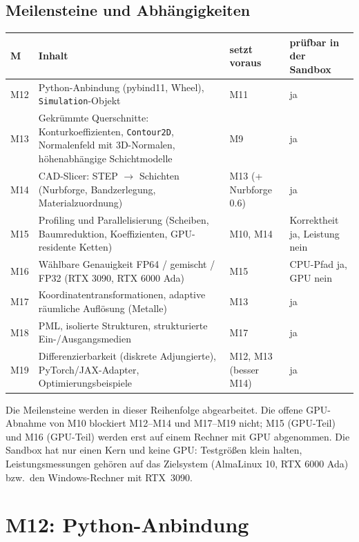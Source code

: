 \subsection{Meilensteine und Abhängigkeiten}
\begin{center}
\small
\begin{tabular}{p{1.0cm}p{6.4cm}p{3.0cm}p{4.0cm}}
\toprule
M & Inhalt & setzt voraus & prüfbar in der Sandbox \\
\midrule
M12 & Python-Anbindung (pybind11, Wheel), \verb|Simulation|-Objekt & M11 & ja \\
M13 & Gekrümmte Querschnitte: Konturkoeffizienten, \verb|Contour2D|, Normalenfeld mit 3D-Normalen,
      höhenabhängige Schichtmodelle & M9 & ja \\
M14 & CAD-Slicer: STEP $\to$ Schichten (Nurbforge, Bandzerlegung, Materialzuordnung) & M13 (+ Nurbforge 0.6) & ja \\
M15 & Profiling und Parallelisierung (Scheiben, Baumreduktion, Koeffizienten, GPU-residente Ketten) & M10, M14 & Korrektheit ja, Leistung nein \\
M16 & Wählbare Genauigkeit FP64 / gemischt / FP32 (RTX 3090, RTX 6000 Ada) & M15 & CPU-Pfad ja, GPU nein \\
M17 & Koordinatentransformationen, adaptive räumliche Auflösung (Metalle) & M13 & ja \\
M18 & PML, isolierte Strukturen, strukturierte Ein-/Ausgangsmedien & M17 & ja \\
M19 & Differenzierbarkeit (diskrete Adjungierte), PyTorch/JAX-Adapter, Optimierungsbeispiele & M12, M13 (besser M14) & ja \\
\bottomrule
\end{tabular}
\end{center}
Die Meilensteine werden in dieser Reihenfolge abgearbeitet. Die offene GPU-Abnahme von M10 blockiert
M12--M14 und M17--M19 nicht; M15 (GPU-Teil) und M16 (GPU-Teil) werden erst auf einem Rechner mit GPU
abgenommen. Die Sandbox hat nur einen Kern und keine GPU: Testgrößen klein halten, Leistungsmessungen
gehören auf das Zielsystem (AlmaLinux 10, RTX 6000 Ada) bzw.\ den Windows-Rechner mit RTX~3090.

\section{M12: Python-Anbindung}\label{sec:python}

